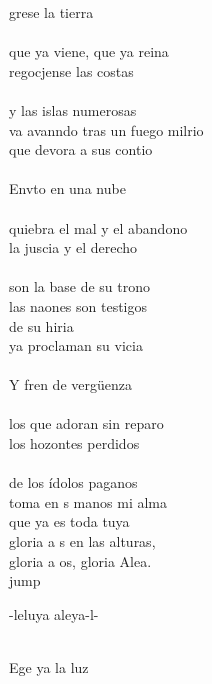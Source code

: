 \begin{cancion}%
	grese la tierra  \\
	\jump\\
que ya viene, que ya reina\\
	regocjense las costas \\
	\jump\\
y las islas numerosas\\
	va avanndo tras un fuego milrio\\
	que devora a sus contio\\
	\jump\\
	Envto en una nube \\
	\jump\\
quiebra el mal y el abandono\\
	la juscia y el derecho \\
	\jump\\
son la base de su trono\\
	las naones son testigos \\
	de su hiria\\
	ya proclaman su vicia\\
	\jump\\
	Y fren de vergüenza \\
	\jump\\
los que adoran sin reparo\\
	los hozontes perdidos \\
	\jump\\
de los ídolos paganos\\
	toma en s manos mi alma \\
	que ya es toda tuya\\
	gloria a s en las alturas, \\
	gloria a os, gloria Alea.\\jump\\
	\begin{chorus}%
	-leluya aleya-l-\\
	\end{chorus}%
	\jump\\
	Ege ya la luz \\

\end{cancion}

